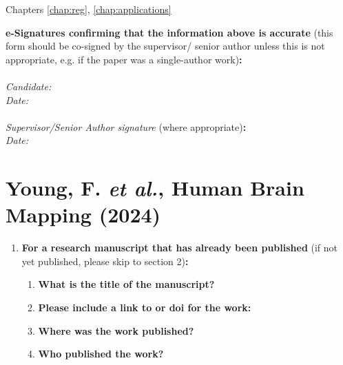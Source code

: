 {\begin{enumerate}[leftmargin=*,label={\bfseries\arabic*.}]
	Chapters \ref{chap:reg}, \ref{chap:applications}

	\end{enumerate}

	\textbf{e-Signatures confirming that the information above is accurate}
	(this form should be co-signed by the supervisor/ senior author unless this is not appropriate, e.g. if the paper was a single-author work)\textbf{:}\\
	\\[\baselineskip]
	\textit{Candidate:}
	\\[\baselineskip]
	\textit{Date:}\\\signdate
	\\[\baselineskip]
	\textit{Supervisor/Senior Author signature} (where appropriate)\textbf{:}
	\\[\baselineskip]
	\textit{Date:}\\\signdate


\section*{Young, F. \textit{et al.}, Human Brain Mapping (2024)}
	\begin{enumerate}[leftmargin=*,label={\bfseries\arabic*.}]\itemsep0em
	\item \textbf{For a research manuscript that has already been published} (if not yet published, please skip to section 2)\textbf{:}
	\begin{enumerate}[label={\alph*)}]\itemsep0em
		\item \textbf{What is the title of the manuscript?}


		\item \textbf{Please include a link to or doi for the work:}


		\item \textbf{Where was the work published?}


		\item \textbf{Who published the work?}



\end{enumerate}
\end{enumerate}}

